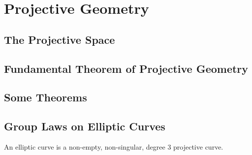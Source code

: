 \chapter{Projective Geometry}

\section{The Projective Space}

\section{Fundamental Theorem of Projective Geometry}

\section{Some Theorems}

\begin{theorem}
\end{theorem}

\begin{theorem}
\end{theorem}

\section{Group Laws on Elliptic Curves}
An elliptic curve is a non-empty, non-singular, degree 3 projective curve. \cite{spallone}
